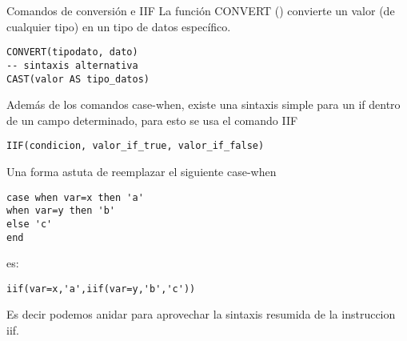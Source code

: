 \begin{frame}[fragile]{Comandos de conversión e IIF}
\protect\hypertarget{comandos-de-conversiuxf3n-e-iif}{}
La función CONVERT () convierte un valor (de cualquier tipo) en un tipo
de datos específico.

\begin{verbatim}
CONVERT(tipodato, dato)
-- sintaxis alternativa
CAST(valor AS tipo_datos)
\end{verbatim}

Además de los comandos case-when, existe una sintaxis simple para un if
dentro de un campo determinado, para esto se usa el comando IIF

\begin{verbatim}
IIF(condicion, valor_if_true, valor_if_false)
\end{verbatim}

Una forma astuta de reemplazar el siguiente case-when

\begin{verbatim}
case when var=x then 'a'
when var=y then 'b' 
else 'c'
end
\end{verbatim}

es:

\begin{verbatim}
iif(var=x,'a',iif(var=y,'b','c'))
\end{verbatim}

Es decir podemos anidar para aprovechar la sintaxis resumida de la
instruccion iif.
\end{frame}

